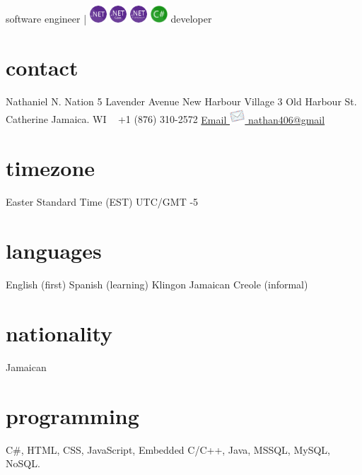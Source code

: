 \documentclass[]{friggeri-cvRS}
\begin{document}
       {software engineer | \includegraphics[height=18pt]{images/net.png} \includegraphics[height=18pt]{images/netcore.png} \includegraphics[height=18pt]{images/netframework.png} \includegraphics[height=18pt]{images/CSharp.png} developer}


\begin{aside}
  \section{contact}
    Nathaniel N. Nation
    5 Lavender Avenue
    New Harbour Village 3
    Old Harbour
    St. Catherine
    Jamaica. WI
    ~
    +1 (876) 310-2572
    \href{mailto:nathan406@gmail.com}{Email \includegraphics[height=16pt]{images/email.png}
    nathan406@gmail}
    \section{timezone}
    Easter Standard Time (EST)
    UTC/GMT -5
    \section{languages}
    English (first)
    Spanish (learning)
    Klingon
    Jamaican Creole (informal)
    \section{nationality}
    Jamaican
    \section{programming}
     C\#, HTML, CSS, JavaScript, Embedded C/C++, Java, MSSQL, MySQL, NoSQL.
\end{aside}
\end{document}
